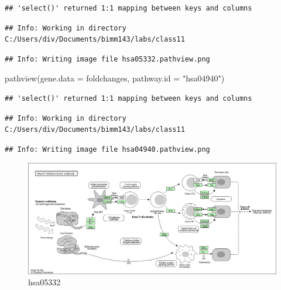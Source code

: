 \documentclass[
]{article}
\newenvironment{Shaded}{\begin{snugshade}}{\end{snugshade}}
\newcommand{\AttributeTok}[1]{\textcolor[rgb]{0.77,0.63,0.00}{#1}}
\newcommand{\FunctionTok}[1]{\textcolor[rgb]{0.00,0.00,0.00}{#1}}
\newcommand{\NormalTok}[1]{#1}
\newcommand{\StringTok}[1]{\textcolor[rgb]{0.31,0.60,0.02}{#1}}
\begin{document}
\begin{verbatim}
## 'select()' returned 1:1 mapping between keys and columns
\end{verbatim}

\begin{verbatim}
## Info: Working in directory C:/Users/div/Documents/bimm143/labs/class11
\end{verbatim}

\begin{verbatim}
## Info: Writing image file hsa05332.pathview.png
\end{verbatim}

\begin{Shaded}
\begin{Highlighting}[]
\FunctionTok{pathview}\NormalTok{(}\AttributeTok{gene.data =}\NormalTok{ foldchanges, }\AttributeTok{pathway.id =} \StringTok{"hsa04940"}\NormalTok{)}
\end{Highlighting}
\end{Shaded}

\begin{verbatim}
## 'select()' returned 1:1 mapping between keys and columns
\end{verbatim}

\begin{verbatim}
## Info: Working in directory C:/Users/div/Documents/bimm143/labs/class11
\end{verbatim}

\begin{verbatim}
## Info: Writing image file hsa04940.pathview.png
\end{verbatim}

\begin{figure}
\centering
\includegraphics{hsa05332.png}
\caption{hsa05332}
\end{figure}
\end{document}
